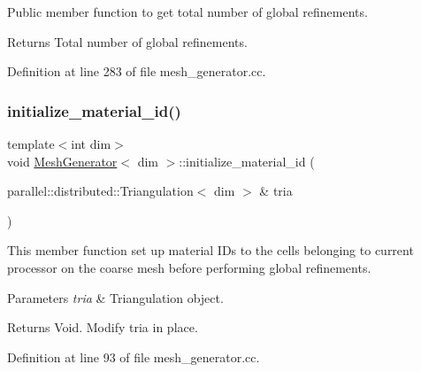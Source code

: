 Public member function to get total number of global refinements.

\begin{DoxyReturn}{Returns}
Total number of global refinements. 
\end{DoxyReturn}


Definition at line 283 of file mesh\+\_\+generator.\+cc.

\mbox{\label{class_mesh_generator_a8c0f48b88435360f1209251253912411}} 
\subsubsection{\texorpdfstring{initialize\+\_\+material\+\_\+id()}{initialize\_material\_id()}}
{\footnotesize\ttfamily template$<$int dim$>$ \\
void \hyperlink{class_mesh_generator}{Mesh\+Generator}$<$ dim $>$\+::initialize\+\_\+material\+\_\+id (\begin{DoxyParamCaption}\item[{parallel\+::distributed\+::\+Triangulation$<$ dim $>$ \&}]{tria }\end{DoxyParamCaption})\hspace{0.3cm}{\ttfamily [private]}}

This member function set up material I\+Ds to the cells belonging to current processor on the coarse mesh before performing global refinements.


\begin{DoxyParams}{Parameters}
{\em tria} & Triangulation object. \\
\hline
\end{DoxyParams}
\begin{DoxyReturn}{Returns}
Void. Modify tria in place. 
\end{DoxyReturn}


Definition at line 93 of file mesh\+\_\+generator.\+cc.

\mbox{\label{class_mesh_generator_a6d216567b5b599cee526f33d435e6655}} 
